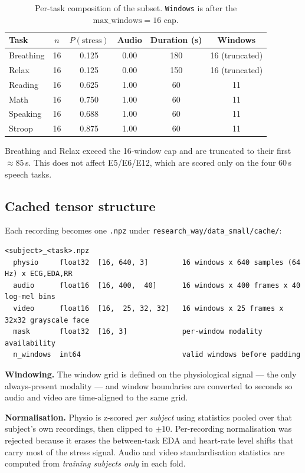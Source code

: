\documentclass[11pt,a4paper]{article}
\newcommand{\code}[1]{\texttt{\small #1}}
\begin{document}
\begin{table}[h]\centering\small
\caption{Per-task composition of the subset. \code{Windows} is after the
$\text{max\_windows}=16$ cap.}
\begin{tabular}{lccccc}
\toprule
Task & $n$ & $P(\text{stress})$ & Audio & Duration (s) & Windows \\
\midrule
Breathing & 16 & 0.125 & 0.00 & 180 & 16 (truncated) \\
Relax     & 16 & 0.125 & 0.00 & 150 & 16 (truncated) \\
Reading   & 16 & 0.625 & 1.00 & 60  & 11 \\
Math      & 16 & 0.750 & 1.00 & 60  & 11 \\
Speaking  & 16 & 0.688 & 1.00 & 60  & 11 \\
Stroop    & 16 & 0.875 & 1.00 & 60  & 11 \\
\bottomrule
\end{tabular}
\end{table}

\noindent
Breathing and Relax exceed the 16-window cap and are truncated to their first
$\approx 85$\,s. This does not affect E5/E6/E12, which are scored only on the four 60\,s
speech tasks.

\subsection{Cached tensor structure}

Each recording becomes one \code{.npz} under \code{research\_way/data\_small/cache/}:

\begin{Verbatim}[fontsize=\small,frame=single,framesep=3mm]
<subject>_<task>.npz
  physio     float32  [16, 640, 3]        16 windows x 640 samples (64 Hz) x ECG,EDA,RR
  audio      float16  [16, 400,  40]      16 windows x 400 frames x 40 log-mel bins
  video      float16  [16,  25, 32, 32]   16 windows x 25 frames x 32x32 grayscale face
  mask       float32  [16, 3]             per-window modality availability
  n_windows  int64                        valid windows before padding
\end{Verbatim}

\noindent
\textbf{Windowing.} The window grid is defined on the physiological signal --- the only
always-present modality --- and window boundaries are converted to seconds so audio and
video are time-aligned to the same grid.

\noindent
\textbf{Normalisation.} Physio is z-scored \emph{per subject} using statistics pooled over
that subject's own recordings, then clipped to $\pm 10$. Per-recording normalisation was
rejected because it erases the between-task EDA and heart-rate level shifts that carry
most of the stress signal. Audio and video standardisation statistics are computed from
\emph{training subjects only} in each fold.
\end{document}
